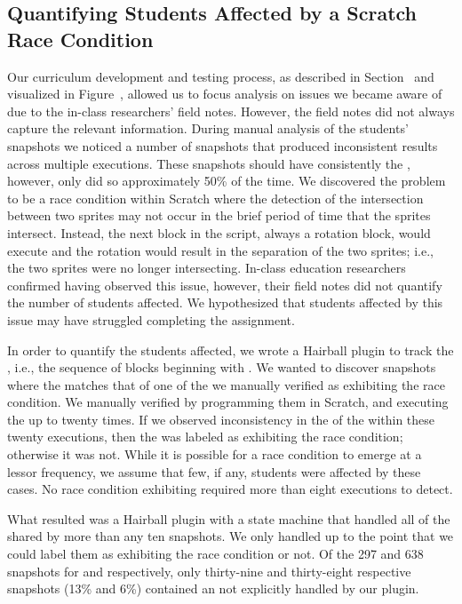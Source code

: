 \subsection{Quantifying Students Affected by a Scratch Race Condition}

Our curriculum development and testing process, as described in
Section~ and visualized in
Figure~, allowed us to focus analysis on issues we became
aware of due to the in-class researchers' field notes. However, the field notes
did not always capture the relevant information. During manual analysis of the
students' snapshots we noticed a number of snapshots that produced inconsistent
results across multiple executions. These snapshots should have consistently
\caught{} the \zebra{}, however, only did so approximately 50\% of the time. We
discovered the problem to be a race condition within Scratch where the
detection of the intersection between two sprites may not occur in the brief
period of time that the sprites intersect. Instead, the next block in the
script, always a rotation block, would execute and the rotation would result in
the separation of the two sprites; i.e., the two sprites were no longer
intersecting. In-class education researchers confirmed having observed this
issue, however, their field notes did not quantify the number of students
affected. We hypothesized that students affected by this issue may have
struggled completing the assignment.

In order to quantify the students affected, we wrote a Hairball plugin to track
the  \exe{}, i.e., the sequence of blocks beginning with
\netclicked{}. We wanted to discover snapshots where the  \exe{}
matches that of one of the  we manually verified as exhibiting the race
condition. We manually verified  by programming them in Scratch, and
executing the \sprogram{} up to twenty times. If we observed inconsistency in
the  of the \zebra{} within these twenty executions, then the \exe{}
was labeled as exhibiting the race condition; otherwise it was not. While it is
possible for a race condition to emerge at a lessor frequency, we assume that
few, if any, students were affected by these cases. No race condition
exhibiting \exe{} required more than eight executions to detect.

What resulted was a Hairball plugin with a state machine that handled all
 of the \net{} shared by more than any ten snapshots. We only handled
 up to the point that we could label them as exhibiting the race
condition or not. Of the 297 and 638 snapshots for \sone{} and \stwo{}
respectively, only thirty-nine and thirty-eight respective snapshots (13\% and
6\%) contained an \exe{} not explicitly handled by our plugin.

